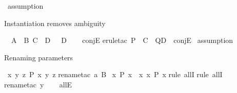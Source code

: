 \begin{isabellebody}
\isamarkupfalse%
\ assumption\isanewline
{}\isamarkupfalse%
%
\endisatagproof
{\isafoldproof}%
%
\isadelimproof
%
\endisadelimproof
%
\begin{isamarkuptext}%
Instantiation removes ambiguity%
\end{isamarkuptext}\isamarkuptrue%
\isamarkupfalse%
\ {\isachardoublequoteopen}{\isasymlbrakk}\ A\ {\isasymand}\ B{\isacharsemicolon}{\kern0pt}\ C\ {\isasymand}\ D\ {\isasymrbrakk}\ {\isasymLongrightarrow}\ D{\isachardoublequoteclose}\isanewline
\ \ \isamarkupfalse%
\ conjE\isanewline
%
\isadelimproof
%
\endisadelimproof
%
\isatagproof
{}\isamarkupfalse%
{\isacharparenleft}{\kern0pt}erule{\isacharunderscore}{\kern0pt}tac\ P\ {\isacharequal}{\kern0pt}\ {\isachardoublequoteopen}C{\isachardoublequoteclose}\ \ Q{\isacharequal}{\kern0pt}{\isachardoublequoteopen}D{\isachardoublequoteclose}\ \ conjE{\isacharparenright}{\kern0pt}\isanewline
\isanewline
{}\isamarkupfalse%
\ assumption\isanewline
{}\isamarkupfalse%
%
\endisatagproof
{\isafoldproof}%
%
\isadelimproof
%
\endisadelimproof
%
\begin{isamarkuptext}%
Renaming parameters%
\end{isamarkuptext}\isamarkuptrue%
\isamarkupfalse%
\ {\isachardoublequoteopen}{\isasymAnd}x\ y\ z{\isachardot}{\kern0pt}\ P\ x\ y\ z{\isachardoublequoteclose}\isanewline
%
\isadelimproof
%
\endisadelimproof
%
\isatagproof
{}\isamarkupfalse%
{\isacharparenleft}{\kern0pt}rename{\isacharunderscore}{\kern0pt}tac\ a\ B{\isacharparenright}{\kern0pt}\isanewline
{}\isamarkupfalse%
%
\endisatagproof
{\isafoldproof}%
%
\isadelimproof
\isanewline
%
\endisadelimproof
\isanewline
{}\isamarkupfalse%
\ {\isachardoublequoteopen}{\isasymforall}x{\isachardot}{\kern0pt}\ P\ x\ {\isasymLongrightarrow}\ {\isasymforall}x{\isachardot}{\kern0pt}\ {\isasymforall}x{\isachardot}{\kern0pt}\ P\ x{\isachardoublequoteclose}\isanewline
%
\isadelimproof
%
\endisadelimproof
%
\isatagproof
{}\isamarkupfalse%
{\isacharparenleft}{\kern0pt}rule\ allI{\isacharparenright}{\kern0pt}\isanewline
{}\isamarkupfalse%
{\isacharparenleft}{\kern0pt}rule\ allI{\isacharparenright}{\kern0pt}\isanewline
\ \ \isamarkupfalse%
{\isacharparenleft}{\kern0pt}rename{\isacharunderscore}{\kern0pt}tac\ y{\isacharparenright}{\kern0pt}\isanewline
\ \ \isamarkupfalse%
\ allE\isanewline
{}\isamarkupfalse%

\end{isabellebody}
